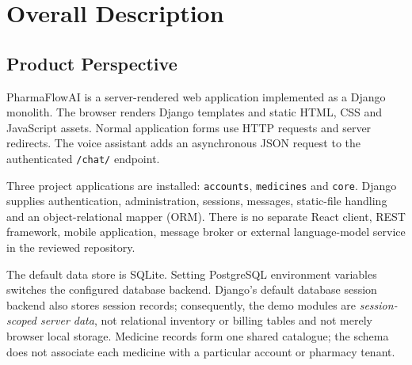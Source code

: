 \documentclass[11pt,a4paper]{article}
\newcommand{\Project}{PharmaFlowAI}
\begin{document}
\clearpage
\section{Overall Description}
\subsection{Product Perspective}
\Project{} is a server-rendered web application implemented as a Django monolith. The browser renders Django templates and static HTML, CSS and JavaScript assets. Normal application forms use HTTP requests and server redirects. The voice assistant adds an asynchronous JSON request to the authenticated \texttt{/chat/} endpoint.

Three project applications are installed: \texttt{accounts}, \texttt{medicines} and \texttt{core}. Django supplies authentication, administration, sessions, messages, static-file handling and an object-relational mapper (ORM). There is no separate React client, REST framework, mobile application, message broker or external language-model service in the reviewed repository.

The default data store is SQLite. Setting PostgreSQL environment variables switches the configured database backend. Django's default database session backend also stores session records; consequently, the demo modules are \emph{session-scoped server data}, not relational inventory or billing tables and not merely browser local storage. Medicine records form one shared catalogue; the schema does not associate each medicine with a particular account or pharmacy tenant.
\end{document}
